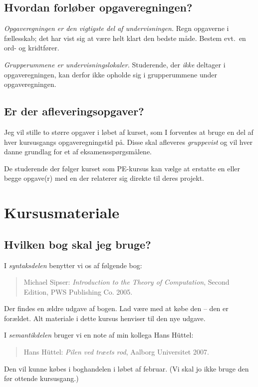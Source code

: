 \documentclass[11pt,a4paper,article,oneside]{memoir}
\begin{document}
\section{Hvordan forløber opgaveregningen?} 
 
\emph{Opgaveregningen er den vigtigste del af undervisningen.} Regn
opgaverne i fællesskab; det har vist sig at være helt klart den bedste
måde. Bestem evt.\ en ord- og kridtfører.

\emph{Grupperummene er undervisningslokaler.} Studerende, der \emph{ikke}
deltager i opgaveregningen, kan derfor ikke opholde sig i grupperummene
under opgaveregningen.

\section{Er der afleveringsopgaver?}

Jeg vil stille to større opgaver i løbet af kurset, som I forventes at
bruge en del af hver kursusgangs opgaveregningstid på. Disse skal
afleveres \emph{gruppevist} og vil hver danne grundlag for et af
eksamensspørgsmålene.
 
De studerende der følger kurset som PE-kursus kan vælge at erstatte en
eller begge opgave(r) med en der relaterer sig direkte til deres projekt.
 
\chapter{Kursusmateriale} 
 
\section{Hvilken bog skal jeg bruge?} 
 
I \emph{syntaksdelen} benytter vi os af følgende bog:
\begin{quote}
  Michael Sipser: \emph{Introduction to the Theory of Computation}, Second
  Edition, PWS Publishing Co. 2005.
\end{quote}
Der findes en ældre udgave af bogen. Lad være med at købe den -- den er
forældet. Alt materiale i dette kursus henviser til den nye udgave.
 
\medskip\noindent I \emph{semantikdelen} bruger vi en note af min kollega
Hans Hüttel:
\begin{quote}
  Hans Hüttel: \emph{Pilen ved træets rod},
  Aalborg Universitet 2007.
\end{quote}
Den vil kunne købes i boghandelen i løbet af februar. (Vi skal jo ikke
bruge den før ottende kursusgang.)
\end{document}
